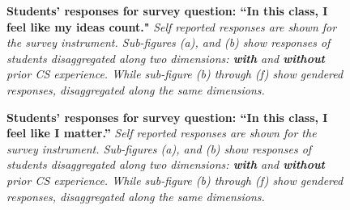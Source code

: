 \documentclass[twoside,openright,titlepage,numbers=noenddot,headinclude,%
               footinclude=true,cleardoublepage=empty,abstractoff,BCOR=5mm,%
               paper=a4,fontsize=11pt,ngerman,american]{scrreprt}
\numberwithin{theorem}{chapter}
\numberwithin{definition}{chapter}
\numberwithin{algorithm}{chapter}
\numberwithin{figure}{chapter}
\numberwithin{table}{chapter}
\numberwithin{equation}{chapter}
\begin{document}

\begin{figure}[!htbp]
  \centering
    \qquad
    \qquad
\caption{\textbf{Students' responses for survey question: ``In this class, I feel like my ideas count."} \textit{Self reported responses are shown for the survey instrument. Sub-figures (a), and (b) show responses of students disaggregated along two dimensions: \textbf{with} and \textbf{without} prior CS experience. While sub-figure (b) through (f) show gendered responses, disaggregated along the same dimensions.}}
\label{blg_3_dis}
\end{figure}



\begin{figure}[!htbp]
  \centering
    \qquad
    \qquad
\caption{\textbf{Students' responses for survey question: ``In this class, I feel like I matter.''} \textit{Self reported responses are shown for the survey instrument. Sub-figures (a), and (b) show responses of students disaggregated along two dimensions: \textbf{with} and \textbf{without} prior CS experience. While sub-figure (b) through (f) show gendered responses, disaggregated along the same dimensions.}}
\label{blg_4_dis}
\end{figure}
\end{document}
